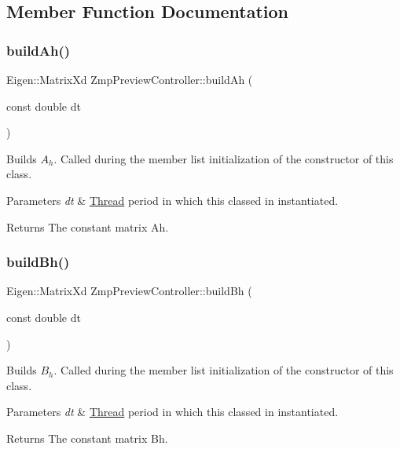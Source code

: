 \subsection{Member Function Documentation}
\hypertarget{classZmpPreviewController_a39ffdba07960f90a6cce247065f12504}{}\label{classZmpPreviewController_a39ffdba07960f90a6cce247065f12504} 
\subsubsection{\texorpdfstring{build\+Ah()}{buildAh()}}
{\footnotesize\ttfamily Eigen\+::\+Matrix\+Xd Zmp\+Preview\+Controller\+::build\+Ah (\begin{DoxyParamCaption}\item[{const double}]{dt }\end{DoxyParamCaption})}

Builds $A_h$. Called during the member list initialization of the constructor of this class.


\begin{DoxyParams}{Parameters}
{\em dt} & \hyperlink{classThread}{Thread} period in which this classed in instantiated. \\
\hline
\end{DoxyParams}
\begin{DoxyReturn}{Returns}
The constant matrix Ah. 
\end{DoxyReturn}
\hypertarget{classZmpPreviewController_a0114a8bdba920b9a7fb6b35e7b90ddd1}{}\label{classZmpPreviewController_a0114a8bdba920b9a7fb6b35e7b90ddd1} 
\subsubsection{\texorpdfstring{build\+Bh()}{buildBh()}}
{\footnotesize\ttfamily Eigen\+::\+Matrix\+Xd Zmp\+Preview\+Controller\+::build\+Bh (\begin{DoxyParamCaption}\item[{const double}]{dt }\end{DoxyParamCaption})}

Builds $B_h$. Called during the member list initialization of the constructor of this class.


\begin{DoxyParams}{Parameters}
{\em dt} & \hyperlink{classThread}{Thread} period in which this classed in instantiated. \\
\hline
\end{DoxyParams}
\begin{DoxyReturn}{Returns}
The constant matrix Bh. 
\end{DoxyReturn}
\hypertarget{classZmpPreviewController_a58723464a66fc3a1122c613500bb2052}{}\label{classZmpPreviewController_a58723464a66fc3a1122c613500bb2052} 
